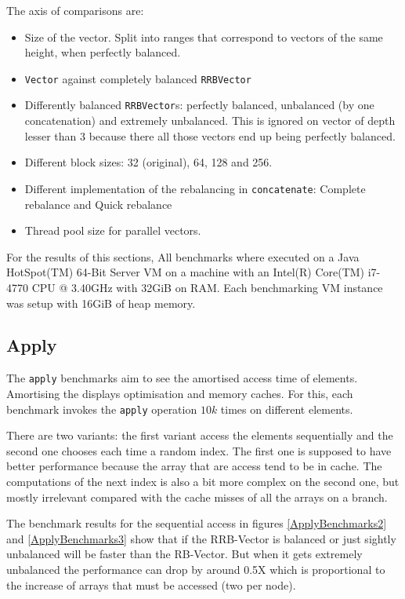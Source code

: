 The axis of comparisons are: 
\begin{itemize}
	\item Size of the vector. Split into ranges that correspond to vectors of the same height, when perfectly balanced.
	\item \texttt{Vector} against completely balanced \texttt{RRBVector}
	\item Differently balanced \texttt{RRBVector}s: perfectly balanced, unbalanced (by one concatenation) and extremely unbalanced. This is ignored on vector of depth lesser than 3 because there all those vectors end up being perfectly balanced.
	\item Different block sizes: 32 (original), 64, 128 and 256.
	\item Different implementation of the rebalancing in \texttt{concatenate}: Complete rebalance and Quick rebalance
	\item Thread pool size for parallel vectors.
\end{itemize}

For the results of this sections, All benchmarks where executed on a Java HotSpot(TM) 64-Bit Server VM on a machine with an Intel(R) Core(TM) i7-4770 CPU @ 3.40GHz with 32GiB on RAM. Each benchmarking VM instance was setup with 16GiB of heap memory. 

\subsection{Apply}
The \texttt{apply} benchmarks aim to see the amortised access time of elements. Amortising the displays optimisation and memory caches. For this, each benchmark invokes the \texttt{apply} operation $10k$ times on different elements. 

There are two variants: the first variant access the elements sequentially and the second one chooses each time a random index. The first one is supposed to have better performance because the array that are access tend to be in cache. The computations of the next index is also a bit more complex on the second one, but mostly irrelevant compared with the cache misses of all the arrays on a branch.

The benchmark results for the sequential access in figures \ref{ApplyBenchmarks2} and \ref{ApplyBenchmarks3} show that if the RRB-Vector is balanced or just sightly unbalanced will be faster than the RB-Vector. But when it gets extremely unbalanced the performance can drop by around 0.5X which is proportional to the increase of arrays that must be accessed (two per node).

